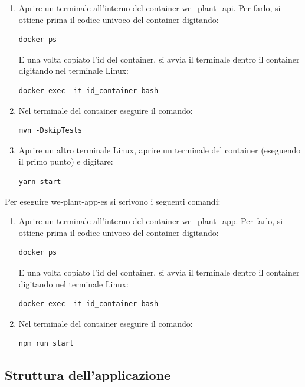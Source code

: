 \documentclass[a4paper]{article}
\begin{document}
	\begin{enumerate}
		\item Aprire un terminale all'interno del container \textsf{we\_plant\_api}. Per farlo, si ottiene prima il codice univoco del container digitando:
		\begin{lstlisting}
docker ps\end{lstlisting}
		E una volta copiato l'id del container, si avvia il terminale dentro il container digitando nel terminale Linux:
		\begin{lstlisting}
docker exec -it id_container bash\end{lstlisting}
		
		\item Nel terminale del container eseguire il comando:
		\begin{lstlisting}
mvn -DskipTests\end{lstlisting}
		
		\item Aprire un altro terminale Linux, aprire un terminale del container (eseguendo il primo punto) e digitare:
		\begin{lstlisting}
yarn start\end{lstlisting}
	\end{enumerate}
	Per eseguire \textsf{we-plant-app-es} si scrivono i seguenti comandi:
	\begin{enumerate}
		\item Aprire un terminale all'interno del container \textsf{we\_plant\_app}. Per farlo, si ottiene prima il codice univoco del container digitando:
		\begin{lstlisting}
docker ps\end{lstlisting}
		E una volta copiato l'id del container, si avvia il terminale dentro il container digitando nel terminale Linux:
		\begin{lstlisting}
docker exec -it id_container bash\end{lstlisting}
		
		\item Nel terminale del container eseguire il comando:
		\begin{lstlisting}
npm run start\end{lstlisting}
	\end{enumerate}\newpage
	
	\subsection{Struttura dell'applicazione}
	
\end{document}
